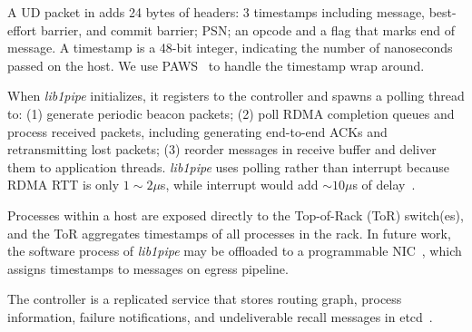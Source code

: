 A UD packet in \sys{} adds 24 bytes of headers: 3 timestamps including message, best-effort barrier, and commit barrier; PSN; an opcode and a flag that marks end of message.
A timestamp is a 48-bit integer, indicating the number of nanoseconds passed on the host. %
We use PAWS~\cite{jacobson1992tcp} to handle the timestamp wrap around.



When \textit{lib1pipe} initializes, it registers to the controller and spawns a polling thread to: (1) generate periodic beacon packets; (2) poll RDMA completion queues and process received packets, including generating end-to-end ACKs and retransmitting lost packets; (3) reorder messages in receive buffer and deliver them to application threads.
\textit{lib1pipe} uses polling rather than interrupt because RDMA RTT is only $1\sim2 \mu$s, while interrupt would add $\sim10 \mu$s of delay~\cite{yang2012poll}.

Processes within a host are exposed directly to the Top-of-Rack (ToR) switch(es), and the ToR aggregates timestamps of all processes in the rack.
In future work, the software process of \textit{lib1pipe} may be offloaded to a programmable NIC~\cite{kaufmann2016high,firestone2018azure}, which assigns timestamps to messages on egress pipeline.

The controller is a replicated service that stores routing graph, process information, failure notifications, and undeliverable recall messages in etcd~\cite{etcd}.




